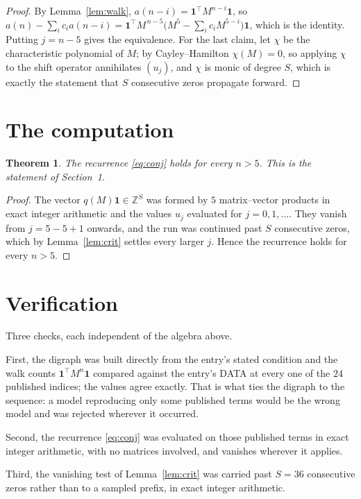 \documentclass[11pt,a4paper]{article}
\theoremstyle{plain}
\newtheorem{theorem}{Theorem}
\theoremstyle{definition}
\begin{document}
\begin{proof}
By Lemma~\ref{lem:walk}, $a(n-i)=\mathbf{1}^{\!\top}M^{n-i}\mathbf{1}$, so
$a(n)-\sum_i c_i a(n-i)
=\mathbf{1}^{\!\top}M^{\,n-5}\bigl(M^{5}-\sum_i c_i M^{5-i}\bigr)
\mathbf{1}$, which is the identity. Putting $j=n-5$ gives the equivalence. For the
last claim, let $\chi$ be the characteristic polynomial of $M$; by Cayley--Hamilton
$\chi(M)=0$, so applying $\chi$ to the shift operator annihilates $(u_j)$, and $\chi$ is
monic of degree $S$, which is exactly the statement that $S$ consecutive zeros propagate
forward.
\end{proof}

\section{The computation}

\begin{theorem}
The recurrence \eqref{eq:conj} holds for every $n>5$. This is the statement of
Section~1.
\end{theorem}

\begin{proof}
The vector $q(M)\mathbf{1}\in\mathbb{Z}^{S}$ was formed by $5$ matrix--vector
products in exact integer arithmetic and the values $u_j$ evaluated for
$j=0,1,\dots$. They vanish from $j=5-5+1$ onwards, and the run was continued past
$S$ consecutive zeros, which by Lemma~\ref{lem:crit} settles every larger $j$. Hence the
recurrence holds for every $n>5$.
\end{proof}

\section{Verification}

Three checks, each independent of the algebra above.

First, the digraph was built directly from the entry's stated condition and the walk counts
$\mathbf{1}^{\!\top}M^{n}\mathbf{1}$ compared against the entry's DATA at every one of
the $24$ published indices; the values agree exactly. That is what ties the digraph to
the sequence: a model reproducing only some published terms would be the wrong model and
was rejected wherever it occurred.

Second, the recurrence \eqref{eq:conj} was evaluated on those published terms in exact
integer arithmetic, with no matrices involved, and vanishes wherever it applies.

Third, the vanishing test of Lemma~\ref{lem:crit} was carried past $S=36$ consecutive
zeros rather than to a sampled prefix, in exact integer arithmetic.
\end{document}

